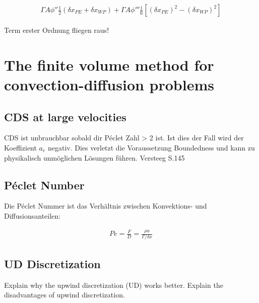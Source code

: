 \documentclass[a4paper]{scrartcl}
\begin{document}
\begin{align}
\boxed{\Gamma A \phi'' \frac{1}{2} \left(\delta x_{PE} + \delta x_{WP}\right)+
\Gamma A \phi''' \frac{1}{6}
\left[\left(\delta x_{PE}\right)^2 - \left(\delta x_{WP}\right)^2 \right]}
\end{align}


Term erster Ordnung fliegen raus!
\section{The finite volume method for convection-diffusion problems}
\subsection{CDS at large velocities}
CDS ist unbrauchbar sobald dir Péclet Zahl > 2 ist. Ist dies der Fall wird der
Koeffizient $a_e$ negativ. Dies verletzt die Voraussetzung Boundedness und kann
zu physikalisch unmöglichen Lösungen führen. Versteeg S.145
\subsection{Péclet Number}
Die Péclet Nummer ist das Verhältnis zwischen Konvektions- und
Diffusionsanteilen:

\begin{align}
Pe=\frac{F}{D} = \frac{\rho u}{\Gamma / \delta x}
\end{align}
\subsection{UD Discretization}
Explain why the upwind discretization (UD) works better. Explain the disadvantages of upwind discretization.
\end{document}

